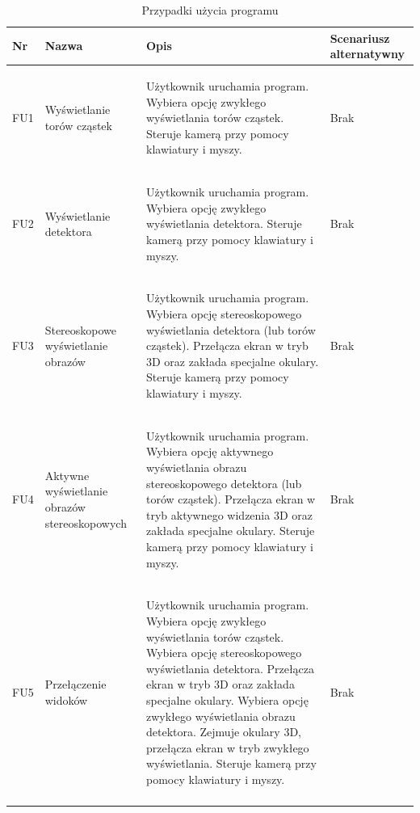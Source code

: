 \begin{table}[H]
\caption{Przypadki użycia programu}
\centering
\footnotesize
\label{tab4}
\begin{tabular}{!{\color{sapphire}\vrule width 1pt}m{0.05\textwidth}!{\color{black}\vrule width 1pt}m{0.16\textwidth}!{\color{black}\vrule width 1pt}m{0.50\textwidth}!{\color{black}\vrule width 1pt}m{0.17\textwidth}!{\color{sapphire}\vrule width 1pt}}
	\hline
	\Centering\bfseries Nr &
	\Centering\bfseries Nazwa &
	\Centering\bfseries Opis &
	\Centering\bfseries Scenariusz alternatywny \\
	\hline
	FU1 & Wyświetlanie torów cząstek & 
	\begin{itemize}
	\itemi Użytkownik uruchamia program.
	\itemi Wybiera opcję zwykłego wyświetlania torów cząstek.
	\itemi Steruje kamerą przy pomocy klawiatury i myszy.
	\end{itemize} & Brak \\ 
	\hline
	FU2 & Wyświetlanie detektora & \begin{itemize}
	\itemi Użytkownik uruchamia program.
	\itemi Wybiera opcję zwykłego wyświetlania detektora.
	\itemi Steruje kamerą przy pomocy klawiatury i myszy.
	\end{itemize} & Brak \\ 
	\hline
	FU3 & Stereoskopowe wyświetlanie obrazów & \begin{itemize}
	\itemi Użytkownik uruchamia program.
	\itemi Wybiera opcję stereoskopowego wyświetlania detektora (lub torów cząstek).
	\itemi Przełącza ekran w tryb 3D oraz zakłada specjalne okulary.
	\itemi Steruje kamerą przy pomocy klawiatury i myszy.
	\end{itemize} & Brak \\ 
	\hline
	FU4 & Aktywne wyświetlanie obrazów stereoskopowych & \begin{itemize}
	\itemi Użytkownik uruchamia program.
	\itemi Wybiera opcję aktywnego wyświetlania obrazu stereoskopowego detektora (lub torów cząstek).
	\itemi Przełącza ekran w tryb aktywnego widzenia 3D oraz zakłada specjalne okulary.
	\itemi Steruje kamerą przy pomocy klawiatury i myszy.
	\end{itemize} & Brak \\ 
	\hline
	FU5 & Przełączenie widoków & \begin{itemize}
	\itemi Użytkownik uruchamia program.
	\itemi Wybiera opcję zwykłego wyświetlania torów cząstek.
	\itemi Wybiera opcję stereoskopowego wyświetlania detektora.
	\itemi Przełącza ekran w tryb 3D oraz zakłada specjalne okulary.
	\itemi Wybiera opcję zwykłego wyświetlania obrazu detektora. 
	\itemi Zejmuje okulary 3D, przełącza ekran w tryb zwykłego wyświetlania.
	\itemi Steruje kamerą przy pomocy klawiatury i myszy.
	\end{itemize} & Brak \\ 
	\hline
\end{tabular}
\end{table}


